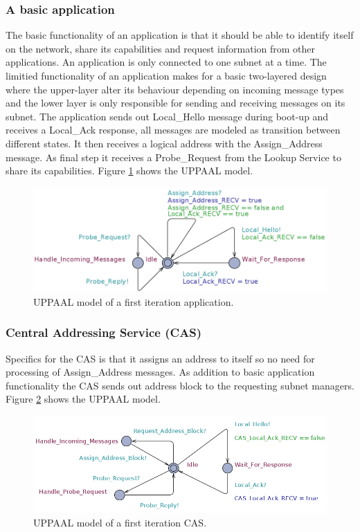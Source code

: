 \subsubsection{A basic application}
The basic functionality of an application is that it should be able to identify
itself on the network, share its capabilities and request information from
other applications. An application is only connected to one subnet at a time.
The limitied functionality of an application makes for a basic two-layered
design where the upper-layer alter its behaviour depending on incoming
message types and the lower layer is only responsible for sending and receiving
messages on its subnet. The application sends out Local\_Hello message during
boot-up and receives a Local\_Ack response, all messages are modeled as
transition between different states. It then receives a logical address with
the Assign\_Address message. As final step it receives a Probe\_Request from
the Lookup Service to share its capabilities. Figure
\ref{fig:iteration1_application} shows the UPPAAL model.

\begin{figure}[h]
    \centering
    \includegraphics[width=\textwidth]{figures/iteration1_application}
    \caption{UPPAAL model of a first iteration application.}
    \label{fig:iteration1_application}
\end{figure}

\subsubsection{Central Addressing Service (CAS)}
Specifics for the CAS is that it assigns an address to itself so no need for
processing of Assign\_Address messages. As addition to basic application
functionality the CAS sends out address block to the requesting subnet
managers. Figure \ref{fig:iteration1_cas} shows the UPPAAL model.

\begin{figure}[h]
    \centering
    \includegraphics[width=\textwidth]{figures/iteration1_cas}
    \caption{UPPAAL model of a first iteration CAS.}
    \label{fig:iteration1_cas}
\end{figure}

